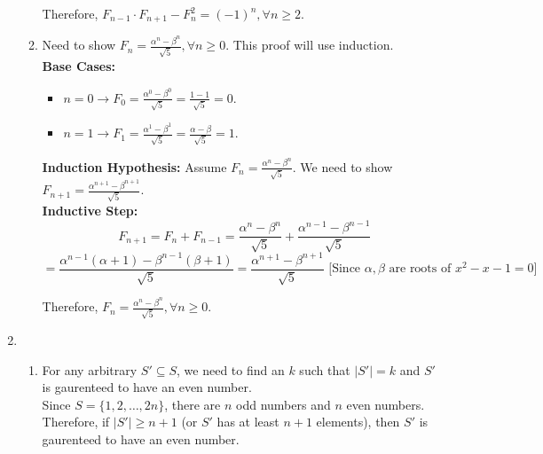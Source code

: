\documentclass[a4paper]{article}
\begin{document}
\begin{enumerate}
\begin{enumerate}
        Therefore, $F_{n-1} \cdot F_{n+1} - F_n^2 = (-1)^n, \forall n \ge 2$. \\

        \item Need to show $F_n = \frac{\alpha^n - \beta^n}{\sqrt{5}}, \forall n \ge 0$. This proof will use induction. \\
        
        \textbf{Base Cases:} \begin{itemize}
            \item $n = 0 \rightarrow F_0 = \frac{\alpha^0 - \beta^0}{\sqrt{5}} = \frac{1 - 1}{\sqrt{5}} = 0$. \\
            \item $n = 1 \rightarrow F_1 = \frac{\alpha^1 - \beta^1}{\sqrt{5}} = \frac{\alpha - \beta}{\sqrt{5}} = 1$. \\
        \end{itemize}
        

        \textbf{Induction Hypothesis:} Assume $F_n = \frac{\alpha^n - \beta^n}{\sqrt{5}}$. We need to show $F_{n+1} = \frac{\alpha^{n+1} - \beta^{n+1}}{\sqrt{5}}$. \\

        \textbf{Inductive Step:}
        \[ F_{n+1} = F_n + F_{n-1} = \frac{\alpha^n - \beta^n}{\sqrt{5}} + \frac{\alpha^{n-1} - \beta^{n-1}}{\sqrt{5}} \]
        \[ = \frac{\alpha^{n-1}(\alpha + 1) - \beta^{n-1}(\beta + 1)}{\sqrt{5}} = \frac{\alpha^{n+1} - \beta^{n+1}}{\sqrt{5}} \text{ [Since $\alpha, \beta$ are roots of $x^2 - x - 1 = 0$]} \]
        
        Therefore, $F_n = \frac{\alpha^n - \beta^n}{\sqrt{5}}, \forall n \ge 0$. \\

    \end{enumerate}

    \newpage
    \item \begin{enumerate}
        \item For  any arbitrary $S' \subseteq S$, we need to find an $k$ such that $|S'| = k$ and $S'$ is gaurenteed to have an even number. \\
        
        Since $S = \{1, 2, \dots, 2n\}$, there are $n$ odd numbers and $n$ even numbers. Therefore, if $|S'| \ge n+1$ (or $S'$ has at least $n + 1$ elements), then $S'$ is gaurenteed to have an even number. \\


\end{enumerate}
\end{enumerate}
\end{document}
